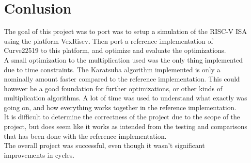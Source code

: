 \section{Conlusion}
The goal of this project was to port was to setup a simulation of the RISC-V ISA using the platform
VexRiscv. Then port a reference implementation of Curve22519 to this platform, and optimize and evaluate the optimizations. \\
A small optimization to the multiplication used was the only thing implemented due to time constraints. The Karatsuba algorithm implemented is only a nominally amount faster compared to the reference implementation. This could however be a good foundation for further optimizations, or other kinds of multiplication algorithms. A lot of time was used to understand what exactly was going on, and how everything works together in the reference implementation.\\
It is difficult to determine the correctness of the project due to the scope of the project, but does seem like it works as intended from the testing and comparisons that has been done with the reference implementation.\\
The overall project was successful, even though it wasn't significant improvements in cycles.
